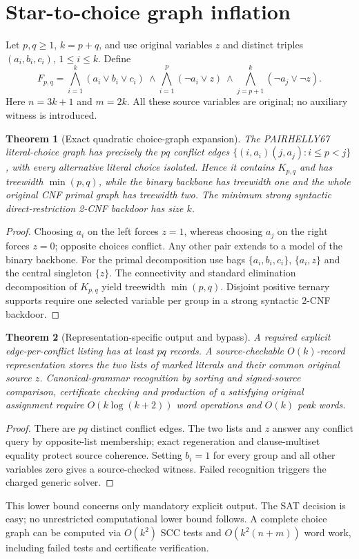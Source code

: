 \documentclass[11pt]{article}
\newtheorem{theorem}{Theorem}
\begin{document}
\section{Star-to-choice graph inflation}
Let $p,q\ge1$, $k=p+q$, and use original variables $z$ and distinct triples $(a_i,b_i,c_i)$, $1\le i\le k$. Define
\[
F_{p,q}=\bigwedge_{i=1}^{k}(a_i\vee b_i\vee c_i)
\ \wedge\bigwedge_{i=1}^{p}(\neg a_i\vee z)
\ \wedge\bigwedge_{j=p+1}^{k}(\neg a_j\vee\neg z).
\]
Here $n=3k+1$ and $m=2k$. All these source variables are original; no auxiliary witness is introduced.
\begin{theorem}[Exact quadratic choice-graph expansion]
The PAIRHELLY67 literal-choice graph has precisely the $pq$ conflict edges $\{(i,a_i)(j,a_j):i\le p<j\}$, with every alternative literal choice isolated. Hence it contains $K_{p,q}$ and has treewidth $\min(p,q)$, while the binary backbone has treewidth one and the whole original CNF primal graph has treewidth two. The minimum strong syntactic direct-restriction 2-CNF backdoor has size $k$.
\end{theorem}
\begin{proof}
Choosing $a_i$ on the left forces $z=1$, whereas choosing $a_j$ on the right forces $z=0$; opposite choices conflict. Any other pair extends to a model of the binary backbone. For the primal decomposition use bags $\{a_i,b_i,c_i\}$, $\{a_i,z\}$ and the central singleton $\{z\}$. The connectivity and standard elimination decomposition of $K_{p,q}$ yield treewidth $\min(p,q)$. Disjoint positive ternary supports require one selected variable per group in a strong syntactic 2-CNF backdoor.
\end{proof}
\begin{theorem}[Representation-specific output and bypass]
A required explicit edge-per-conflict listing has at least $pq$ records. A source-checkable $O(k)$-record representation stores the two lists of marked literals and their common original source $z$. Canonical-grammar recognition by sorting and signed-source comparison, certificate checking and production of a satisfying original assignment require $O(k\log(k+2))$ word operations and $O(k)$ peak words.
\end{theorem}
\begin{proof}
There are $pq$ distinct conflict edges. The two lists and $z$ answer any conflict query by opposite-list membership; exact regeneration and clause-multiset equality protect source coherence. Setting $b_i=1$ for every group and all other variables zero gives a source-checked witness. Failed recognition triggers the charged generic solver.
\end{proof}
This lower bound concerns only mandatory explicit output. The SAT decision is easy; no unrestricted computational lower bound follows. A complete choice graph can be computed via $O(k^2)$ SCC tests and $O(k^2(n+m))$ word work, including failed tests and certificate verification.
\end{document}
